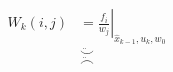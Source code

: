 \documentclass{article}
\begin{document}
\pagestyle{empty}


\begin{equation}
	\begin{split}
	W_k(i,j) &= \left. \frac{f_i}{w_j} \right \vert_{\hat{x}_{k-1},u_k,w_0}
	\end{split}
\end{equation}
$$\ddot\smile$$
$$\ddot\frown$$
\end{document}

